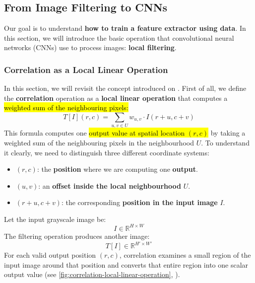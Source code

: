 \subsection{From Image Filtering to CNNs}\label{sec:from-image-filtering-to-cnns}

Our goal is to understand \textbf{how to train a feature extractor using data}. In this section, we will introduce the basic operation that convolutional neural networks (CNNs) use to process images: \textbf{local filtering}.

\longline

\subsubsection{Correlation as a Local Linear Operation}\label{sec:correlation-as-a-local-linear-operation-cnns}

In this section, we will revisit the concept introduced on . First of all, we define the \textbf{correlation} operation as a \textbf{local linear operation} that computes a \hl{weighted sum of the neighbouring pixels:}
\begin{equation*}
    T\left[I\right]\left(r,c\right) = \sum_{u,v \in U} w_{u,v} \cdot I\left(r+u, c+v\right)
\end{equation*}
This formula computes one \hl{output value at spatial location $\left(r,c\right)$} by taking a weighted sum of the neighbouring pixels in the neighbourhood $U$. To understand it clearly, we need to distinguish three different coordinate systems:
\begin{itemize}
    \item $\left(r,c\right)$: the \textbf{position} where we are computing one \textbf{output}.
    \item $\left(u,v\right)$: an \textbf{offset inside the local neighbourhood} $U$.
    \item $\left(r+u, c+v\right)$: the corresponding \textbf{position in the input image} $I$.
\end{itemize}
Let the input grayscale image be:
\begin{equation*}
    I \in \mathbb{R}^{H \times W}
\end{equation*}
The filtering operation produces another image:
\begin{equation*}
    T\left[I\right] \in \mathbb{R}^{H' \times W'}
\end{equation*}
For each valid output position $\left(r,c\right)$, correlation examines a small region of the input image around that position and converts that entire region into one scalar output value (see \autoref{fig:correlation-local-linear-operation}, ).

